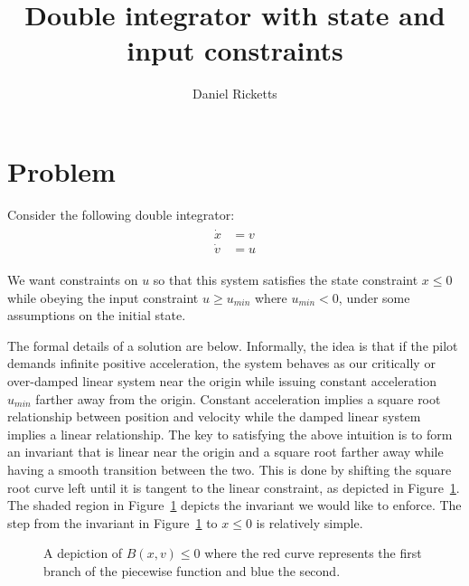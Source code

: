\documentclass[12pt]{article}
\title{Double integrator with state and input constraints}
\author{Daniel Ricketts}
\newcommand{\umin}{u_{min}}
\newcommand{\p}{\gamma}
\begin{document}
\maketitle

\section{Problem}
Consider the following double integrator:
\begin{align}
\begin{split}
\dot{x} &= v \\
\dot{v} &= u
\end{split}
\label{sys1}
\end{align}

We want constraints on $u$ so that this system satisfies the state
constraint $x \leq 0$ while obeying the input constraint $u \geq \umin$
where $\umin < 0$, under some assumptions on the initial state.

The formal details of a solution are below. Informally, the idea is that if
the pilot demands infinite positive acceleration, the system behaves as our
critically or over-damped linear system near the origin while issuing
constant acceleration $\umin$ farther away from the origin. Constant
acceleration implies a square root relationship between position and
velocity while the damped linear system implies a linear relationship. The
key to satisfying the above intuition is to form an invariant that is
linear near the origin and a square root farther away while having a smooth
transition between the two. This is done by shifting the square root curve
left until it is tangent to the linear constraint, as depicted in
Figure~\ref{fig:sqrt-lin}. The shaded region in Figure~\ref{fig:sqrt-lin}
depicts the invariant we would like to enforce. The step from the invariant
in Figure~\ref{fig:sqrt-lin} to $x \leq 0$ is relatively simple.

\begin{figure}[H]
\centering
{}
\caption{A depiction of $B(x,v) \leq 0$ where the red curve represents the first branch of the piecewise function and blue the second.}
\label{fig:sqrt-lin}
\end{figure}
\end{document}
